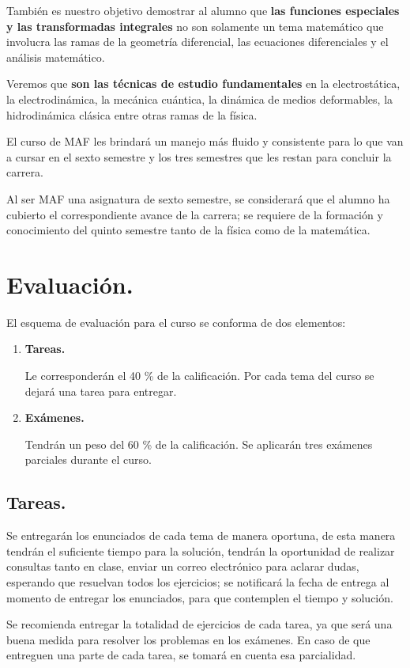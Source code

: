\documentclass[12pt]{article}
\numberwithin{equation}{section}
\begin{document}
También es nuestro objetivo demostrar al alumno que \textbf{las funciones especiales y las transformadas integrales} no son solamente un tema matemático que involucra las ramas de la geometría diferencial, las ecuaciones diferenciales y el análisis matemático.
\par
Veremos que \textbf{son las técnicas de estudio fundamentales} en la electrostática, la electrodinámica, la mecánica cuántica, la dinámica de medios deformables, la hidrodinámica clásica entre otras ramas de la física.
\par
El curso de MAF les brindará un manejo más fluido y consistente para lo que van a cursar en el sexto semestre y los tres semestres que les restan para concluir la carrera.
\par
Al ser MAF una asignatura de sexto semestre, se considerará que el alumno ha cubierto el correspondiente avance de la carrera; se requiere de la formación y conocimiento del quinto semestre tanto de la física como de la matemática.

\section{Evaluación.}

El esquema de evaluación para el curso se conforma de dos elementos:
\begin{enumerate}[label=\alph*)]
\item \textbf{Tareas.}

Le corresponderán el \num{40} \% de la calificación. Por cada tema del curso se dejará una tarea para entregar.
\item \textbf{Exámenes.}

Tendrán un peso del \num{60} \% de la calificación. Se aplicarán tres exámenes parciales durante el curso.
\end{enumerate}

\subsection{Tareas.}

Se entregarán los enunciados de cada tema de manera oportuna, de esta manera tendrán el suficiente tiempo para la solución, tendrán la oportunidad de realizar consultas tanto en clase, enviar un correo electrónico para aclarar dudas, esperando que resuelvan todos los ejercicios; se notificará la fecha de entrega al momento de entregar los enunciados, para que contemplen el tiempo y solución.
\par
Se recomienda entregar la totalidad de ejercicios de cada tarea, ya que será una buena medida para resolver los problemas en los exámenes. En caso de que entreguen una parte de cada tarea, se tomará en cuenta esa parcialidad.
\end{document}
